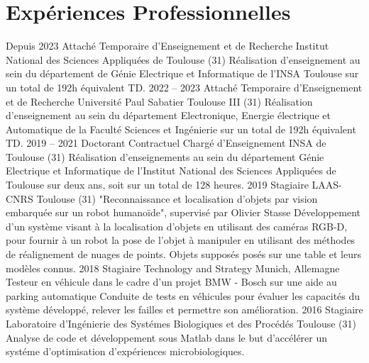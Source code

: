 \documentclass[11pt,a4paper,sans]{moderncv}         %
\begin{document}
\section{Exp\'eriences Professionnelles}\label{exp-professionnelles}
\cventry
{Depuis 2023}
{Attach\'e Temporaire d'Enseignement et de Recherche}
{Institut National des Sciences Appliqu\'ees de Toulouse (31)}
{}
{}
{
  R\'ealisation d'enseignement au sein du d\'epartement de G\'enie Electrique et Informatique de l'INSA Toulouse sur un total de 192h \'equivalent TD.
}
%
\cventry
{2022 -- 2023}
{Attach\'e Temporaire d'Enseignement et de Recherche}
{Universit\'e Paul Sabatier Toulouse III (31)}
{}
{}
{
  R\'ealisation d'enseignement au sein du d\'epartement Electronique, Energie \'electrique et Automatique de la Facult\'e Sciences et Ing\'enierie sur un total de 192h \'equivalent TD.
}
%
\cventry
{2019 -- 2021}
{Doctorant Contractuel Charg\'e d'Enseignement}
{INSA de Toulouse (31)}
{}
{}
{
  R\'ealisation d'enseignements au sein du d\'epartement G\'enie Electrique et Informatique de l'Institut National des Sciences Appliqu\'ees de Toulouse sur deux ans, soit sur un total de 128 heures.
}
%
\cventry
{2019}
{Stagiaire}
{LAAS-CNRS}
{Toulouse (31)}
{"Reconnaissance et localisation d'objets par vision embarqu\'ee sur un robot humano\"ide", supervis\'e par Olivier Stasse}
{
  D\'eveloppement d'un syst\`eme visant \`a la localisation d'objets en utilisant des cam\'eras RGB-D, pour fournir \`a un robot la pose de l'objet \`a manipuler en utilisant des m\'ethodes de r\'ealignement de nuages de points.
  Objets suppos\'es pos\'es sur une table et leurs mod\`eles connus.
}
%
%
\cventry
{2018}
{Stagiaire}
{Technology and Strategy}
{Munich, Allemagne}
{Testeur en v\'ehicule dans le cadre d'un projet BMW - Bosch sur une aide au parking automatique}
{
  Conduite de tests en v\'ehicules pour \'evaluer les capacit\'es du syst\`eme d\'evelopp\'e, relever les failles et permettre son am\'elioration.
}
%
%
\cventry
{2016}
{Stagiaire}
{Laboratoire d'Ing\'enierie des Syst\'emes Biologiques et des Proc\'ed\'es}
{Toulouse (31)}
{}
{
  Analyse de code et d\'eveloppement sous Matlab dans le but d'acc\'el\'erer un syst\'eme d'optimisation d'exp\'eriences microbiologiques.
}
%
\end{document}
